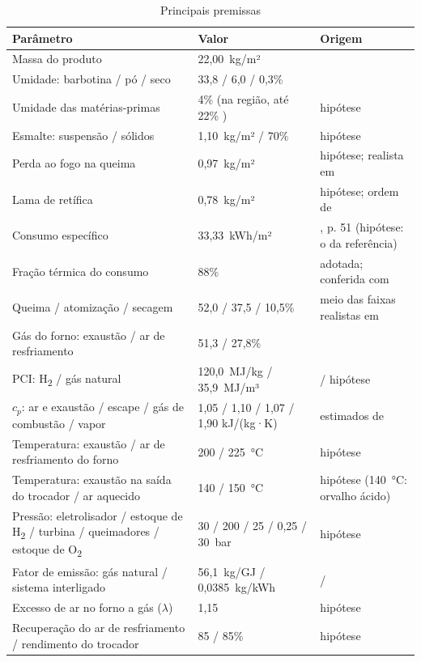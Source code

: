 \documentclass[10pt,a4paper,twocolumn]{article}
\newcommand{\Ht}{H\textsubscript{2}}
\newcommand{\Ot}{O\textsubscript{2}}
\begin{document}
\begin{table}[!t]
\centering
\caption{Principais premissas}\label{tab:premissas}
\footnotesize
\begin{tabular}{L{3.85cm}L{2.05cm}L{1.95cm}}
\toprule
\textbf{Parâmetro} & \textbf{Valor} & \textbf{Origem}\\ \midrule
Massa do produto & 22,00~kg/m² & \cite{alves2023a}\\
Umidade: barbotina / pó / seco & 33,8 / 6,0 / 0,3\% & \cite{oliveira2015,negre2000}\\
Umidade das matérias-primas & 4\% (na região, até 22\% \cite{rigobelo2026}) & hipótese\\
Esmalte: suspensão / sólidos & 1,10~kg/m² / 70\% & hipótese\\
Perda ao fogo na queima & 0,97~kg/m² & hipótese; realista em \cite{rigobelo2026}\\
Lama de retífica & 0,78~kg/m² & hipótese; ordem de \cite{sartor2021}\\
Consumo específico & 33,33~kWh/m² & \cite{portobello2025}, p. 51 (hipótese: o da referência)\\
Fração térmica do consumo & 88\% & adotada; conferida com \cite{portobello2025}\\
Queima / atomização / secagem & 52,0 / 37,5 / 10,5\% & meio das faixas realistas em \cite{rigobelo2026}\\
Gás do forno: exaustão / ar de resfriamento & 51,3 / 27,8\% & \cite{brown1996}\\
PCI: \Ht{} / gás natural & 120,0~MJ/kg / 35,9~MJ/m³ & \cite{cengel2013} / hipótese\\
$c_p$: ar e exaustão / escape / gás de combustão / vapor & 1,05 / 1,10 / 1,07 / 1,90 kJ/(kg·K) & estimados de \cite{cengel2013}\\
Temperatura: exaustão / ar de resfriamento do forno & 200 / 225~°C & hipótese\\
Temperatura: exaustão na saída do trocador / ar aquecido & 140 / 150~°C & hipótese (140~°C: orvalho ácido)\\
Pressão: eletrolisador / estoque de \Ht{} / turbina / queimadores / estoque de \Ot & 30 / 200 / 25 / 0,25 / 30~bar & hipótese\\
Fator de emissão: gás natural / sistema interligado & 56,1~kg/GJ / 0,0385~kg/kWh & \cite{ipcc2006} / \cite{mcti2024}\\
Excesso de ar no forno a gás ($\lambda$) & 1,15 & hipótese\\
Recuperação do ar de resfriamento / rendimento do trocador & 85 / 85\% & hipótese\\

\end{tabular}
\end{table}
\end{document}
